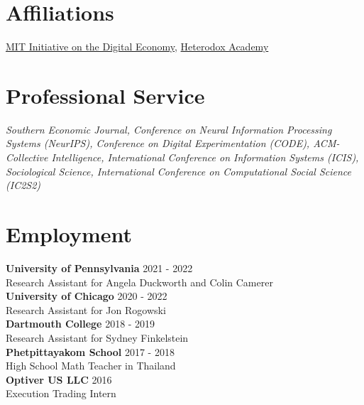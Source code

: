 \documentclass[margin,line,pifont,palatino,courier, 9pt]{res}
\begin{document}
\begin{resume}

\section{\sc Affiliations}
\href{https://ide.mit.edu/}{MIT Initiative on the Digital Economy}, \href{https://heterodoxacademy.org/}{Heterodox Academy}

\section{\sc Professional Service}
\textit{Southern Economic Journal, Conference on Neural Information Processing Systems (NeurIPS), Conference on Digital Experimentation (CODE), ACM-Collective Intelligence, International Conference on Information Systems (ICIS), Sociological Science, International Conference on Computational Social Science (IC2S2)}

\section{\sc Employment}
\textbf{University of Pennsylvania} \hfill 2021 - 2022 \\
Research Assistant for Angela Duckworth and Colin Camerer \vspace{2mm}\\
\textbf{University of Chicago} \hfill 2020 - 2022\\
Research Assistant for Jon Rogowski \vspace{2mm}\\
\textbf{Dartmouth College} \hfill 2018 - 2019 \\
Research Assistant for Sydney Finkelstein \vspace{2mm}\\
\textbf{Phetpittayakom School} \hfill 2017 - 2018 \\
High School Math Teacher in Thailand \vspace{2mm}\\ 
\textbf{Optiver US LLC} \hfill 2016 \\
Execution Trading Intern

\end{resume}
\end{document}
